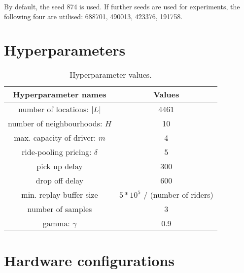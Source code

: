 By default, the seed 874 is used. If further seeds are used for experiments, the following four are utilised: 688701, 490013, 423376, 191758.



\section{Hyperparameters}
\label{appendix:hyperparameters}

\begin{table}[!htbp]
    \centering
    \begin{tabular}{| c | c |}
    \hline 
        \textbf{Hyperparameter names} & \textbf{Values} \\
        \hline 
        number of locations: $|L|$ & 4461  \\
        number of neighbourhoods: $H$& 10\\ 
        max. capacity of driver: $m$ & 4 \\
        ride-pooling pricing: $\delta$ & 5  \\
        pick up delay & 300   \\
        drop off delay & 600  \\
        min. replay buffer size & $5*10^{5}$ / (number of riders)  \\
        number of samples & 3  \\
        gamma: $\gamma$ & 0.9  \\
        \hline 
    \end{tabular}
    \caption{Hyperparameter values.}
    \label{tabl:dataset_params}
\end{table}





\newpage
\section{Hardware configurations}

